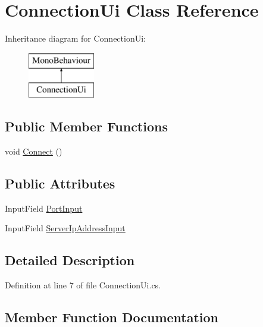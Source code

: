\hypertarget{class_connection_ui}{}\section{Connection\+Ui Class Reference}
\label{class_connection_ui}
Inheritance diagram for Connection\+Ui\+:\begin{figure}[H]
\begin{center}
\leavevmode
\includegraphics[height=2.000000cm]{class_connection_ui}
\end{center}
\end{figure}
\subsection*{Public Member Functions}
\begin{DoxyCompactItemize}
\item 
void \mbox{\hyperlink{class_connection_ui_a6c2286d1c435b94a5de2b958e03146b8}{Connect}} ()
\end{DoxyCompactItemize}
\subsection*{Public Attributes}
\begin{DoxyCompactItemize}
\item 
Input\+Field \mbox{\hyperlink{class_connection_ui_aed563c13ba5341487b65764173a7523b}{Port\+Input}}
\item 
Input\+Field \mbox{\hyperlink{class_connection_ui_a8b5ff35ab29a4964a0414ce73eca4cd7}{Server\+Ip\+Address\+Input}}
\end{DoxyCompactItemize}


\subsection{Detailed Description}


Definition at line 7 of file Connection\+Ui.\+cs.



\subsection{Member Function Documentation}
\mbox{\label{class_connection_ui_a6c2286d1c435b94a5de2b958e03146b8}} 
